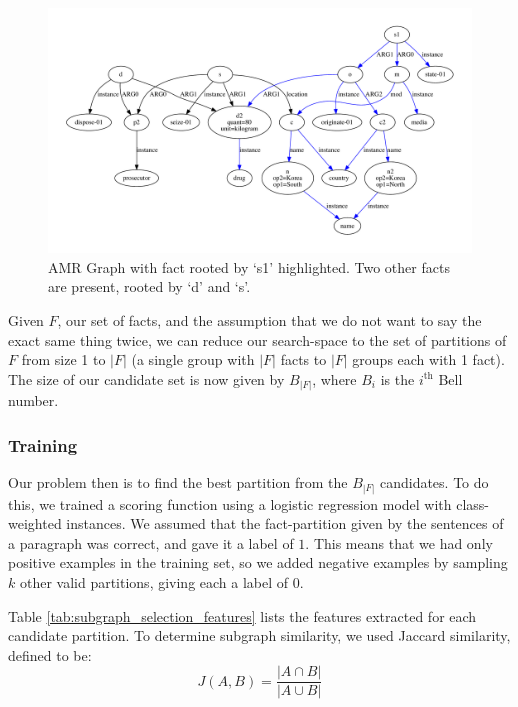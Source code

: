 \documentclass[12pt]{article}
\begin{document}
\begin{figure}
\includegraphics[width=\linewidth]{amr_example_3_merged_s1_highlighted.pdf}
\caption{AMR Graph with fact rooted by `s1' highlighted. Two other facts are present, rooted by `d' and `s'.}
\label{fig:amr_example_3_merged_s1_highlighted}
\end{figure}

Given $F$, our set of facts, and the assumption that we do not want to say the exact same thing twice, we can reduce our search-space to the set of partitions of $F$ from size 1 to $|F|$ (a single group with $|F|$ facts to $|F|$ groups each with 1 fact). The size of our candidate set is now given by $B_{|F|}$, where $B_i$ is the $i^{\text{th}}$ Bell number.

\subsubsection{Training}
Our problem then is to find the best partition from the $B_{|F|}$ candidates. To do this, we trained a scoring function using a logistic regression model with class-weighted instances. We assumed that the fact-partition given by the sentences of a paragraph was correct, and gave it a label of $1$. This means that we had only positive examples in the training set, so we added negative examples by sampling $k$ other valid partitions, giving each a label of $0$.

Table \ref{tab:subgraph_selection_features} lists the features extracted for each candidate partition. To determine subgraph similarity, we used
Jaccard similarity, defined to be:
$$J(A,B) = \frac{\lvert A \cap B \rvert}{\lvert A \cup B \rvert}$$
\end{document}
